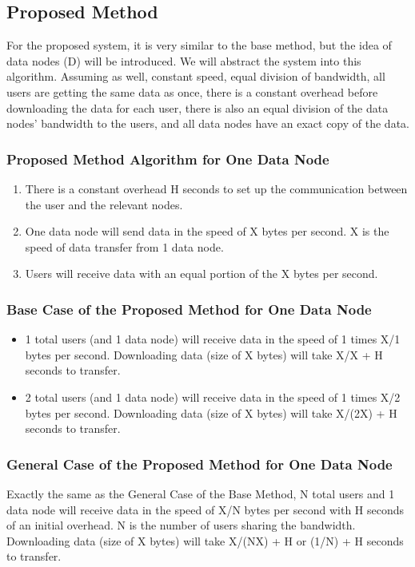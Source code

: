 \documentclass[acmsmall]{acmart}
\begin{document}
\subsection{Proposed Method}
For the proposed system, it is very similar to the base method, but the idea of data nodes (D) will be introduced. We will abstract the system into this algorithm. Assuming as well, constant speed, equal division of bandwidth, all users are getting the same data as once, there is a constant overhead before downloading the data for each user, there is also an equal division of the data nodes' bandwidth to the users, and all data nodes have an exact copy of the data.

\subsubsection{Proposed Method Algorithm for One Data Node}

\begin{enumerate}
    \item There is a constant overhead H seconds to set up the communication between the user and the relevant nodes.
    \item One data node will send data in the speed of X bytes per second. X is the speed of data transfer from 1 data node.
    \item Users will receive data with an equal portion of the X bytes per second. 
\end{enumerate}

\subsubsection{Base Case of the Proposed Method for One Data Node}

\begin{itemize} 
    \item 1 total users (and 1 data node) will receive data in the speed of 1 times X/1 bytes per second. Downloading data (size of X bytes) will take X/X + H seconds to transfer.
    \item 2 total users (and 1 data node) will receive data in the speed of 1 times X/2 bytes per second. Downloading data (size of X bytes) will take X/(2X) + H seconds to transfer.
\end{itemize}


\subsubsection{General Case of the Proposed Method for One Data Node} 
Exactly the same as the  General Case of the Base Method, N total users and 1 data node will receive data in the speed of X/N bytes per second with H seconds of an initial overhead. N is the number of users sharing the bandwidth. Downloading data (size of X bytes)  will take X/(NX) + H or (1/N) + H seconds to transfer.
\end{document}
